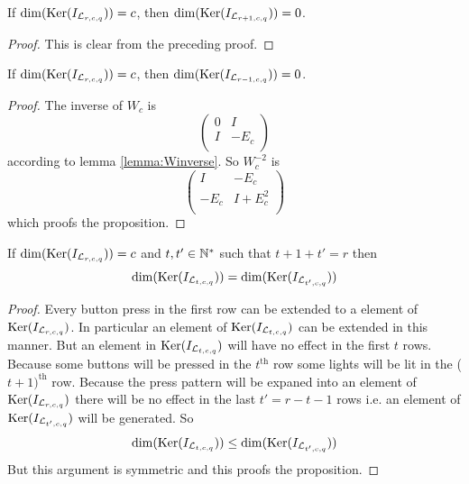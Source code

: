 \begin{corollary}
	If $\dim(\operatorname{Ker}(I_{\mathcal{L}_{r,c,q}})) = c$, then
	$\dim(\operatorname{Ker}(I_{\mathcal{L}_{r+1,c,q}})) = 0$. 
\end{corollary}

\begin{proof}
	This is clear from the preceding proof.
\end{proof}

\begin{proposition}
	If $\dim(\operatorname{Ker}(I_{\mathcal{L}_{r,c,q}})) = c$, then
	$\dim(\operatorname{Ker}(I_{\mathcal{L}_{r-1,c,q}})) = 0$.
\end{proposition}

\begin{proof}
	The inverse of $W_{c}$ is
	\[
 		\left(
		\begin{array}{cc}
			0 & I      \\
			I & -E_{c} \\
		\end{array}
		\right)
	\]
	according to lemma \ref{lemma:Winverse}. So $W_{c}^{-2}$ is
	\[
 		\left(
		\begin{array}{cc}
			I      & -E_{c}      \\
			-E_{c} & I+E_{c}^{2} \\
		\end{array}
		\right)
	\]
	which proofs the proposition.	
\end{proof}

\begin{proposition}
	If $\dim(\operatorname{Ker}(I_{\mathcal{L}_{r,c,q}})) = c$ and $t,t'\in\mathbb{N}^{*}$ such
	that $t + 1 + t' = r$ then
	\[
		\dim(\operatorname{Ker}(I_{\mathcal{L}_{t,c,q}})) = \dim(\operatorname{Ker}(I_{\mathcal{L}_{t',c,q}}))
	\]
\end{proposition}

\begin{proof}
	Every button press in the first row can be extended to a element
	of $\operatorname{Ker}(I_{\mathcal{L}_{r,c,q}})$. In particular an element of 
	$\operatorname{Ker}(I_{\mathcal{L}_{t,c,q}})$ can be extended in this manner. But an
	element in $\operatorname{Ker}(I_{\mathcal{L}_{t,c,q}})$ will have no effect in the 
	first $t$ rows.
	Because some buttons will be pressed in the $t^{\text{th}}$ row some lights
	will be lit in the ($t+1)^{\text{th}}$ row. Because the press pattern will
	be expaned into an element of $\operatorname{Ker}(I_{\mathcal{L}_{r,c,q}})$ there will
	be no effect in the last $t' = r - t - 1$ rows i.e. an element of
	$\operatorname{Ker}(I_{\mathcal{L}_{t',c,q}})$ will be generated. So
	\[
		\dim(\Ker(I_{\mathcal{L}_{t,c,q}}))%
		\le%
		\dim(\Ker(I_{\mathcal{L}_{t',c,q}}))
	\]
	But this argument is symmetric and this proofs the proposition.
\end{proof}
